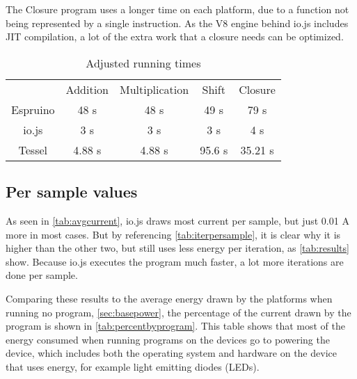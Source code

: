 The Closure program uses a longer time on each platform, due to a function not being represented by a single instruction.
As the V8 engine behind io.js includes JIT compilation, a lot of the extra work that a closure needs can be optimized.

\begin{table}[h]
\centering
\begin{tabular}{ c  c  c  c  c }
 & Addition & Multiplication & Shift & Closure \\
 \rowcolor[gray]{.9}
 Espruino & 48 \si{\second} & 48 \si{\second} & 49 \si{\second} & 79 \si{\second} \\ 
 \rowcolor[gray]{.5}
 io.js  & 3 \si{\second} & 3 \si{\second} & 3 \si{\second} & 4 \si{\second} \\ 
 \rowcolor[gray]{.9}
 Tessel & 4.88 \si{\second} & 4.88 \si{\second} & 95.6 \si{\second} & 35.21 \si{\second}\\ 
\end{tabular}
\caption{Adjusted running times}
\label{tab:fixedtimes}
\end{table}

\subsection{Per sample values}
As seen in \cref{tab:avgcurrent}, io.js draws most current per sample, but just 0.01 \si{\ampere} more in most cases.
But by referencing \cref{tab:iterpersample}, it is clear why it is higher than the other two, but still uses less energy per iteration, as \cref{tab:results} show.
Because io.js executes the program much faster, a lot more iterations are done per sample.

Comparing these results to the average energy drawn by the platforms when running no program, \cref{sec:basepower}, the percentage of the current drawn by the program is shown in \cref{tab:percentbyprogram}.
This table shows that most of the energy consumed when running programs on the devices go to powering the device, which includes both the operating system and hardware on the device that uses energy, for example light emitting diodes (LEDs).


